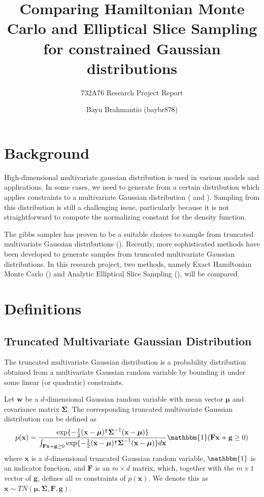 \documentclass{scrartcl}
\title{Comparing Hamiltonian Monte Carlo and Elliptical Slice Sampling for constrained Gaussian distributions}
\subtitle{732A76 Research Project Report}
\author{Bayu Brahmantio (baybr878)}
\numberwithin{equation}{section}
\begin{document}
\maketitle

\section{Background}
High-dimensional multivariate gaussian distribution is used in various models and applications. In some cases, we need to generate from a certain distribution which applies constraints to a multivariate Gaussian distribution (\cite{gelfand1992GS} and \cite{RodrguezYam2004EfficientGS}). Sampling from this distribution is still a challenging issue, particularly because it is not straightforward to compute the normalizing constant for the density function.  

The gibbs sampler has proven to be a suitable choices to sample from truncated multivariate Gaussian distributions (\cite{gelfand1992GS}). Recently, more sophisticated methods have been developed to generate samples from truncated multivariate Gaussian distributions. In this research project, two methods, namely Exact Hamiltonian Monte Carlo (\cite{pakman2013exact}) and Analytic Elliptical Slice Sampling (\cite{Fagan2016ESSwEP}), will be compared. 


\section{Definitions}
\subsection{Truncated Multivariate Gaussian Distribution}
The truncated multivariate Gaussian distribution is a probability distribution obtained from a multivariate Gaussian random variable by bounding it under some linear (or quadratic) constraints.   

Let $\textbf{w}$ be a $d$-dimensional Gaussian random variable with mean vector $\boldsymbol{\mu}$ and covariance matrix $\boldsymbol{\Sigma}$. The corresponding truncated multivariate Gaussian distribution can be defined as
\begin{equation}\label{eq:tmg}
	p(\boldsymbol{\textbf{x}}) = \frac{\exp\{-\frac{1}{2}(\textbf{x}-\boldsymbol{\mu})^{\intercal} \boldsymbol{\Sigma}^{-1}(\textbf{x}-\boldsymbol{\mu})\}}{\int_{\textbf{F}\textbf{x} + \textbf{g} \geq 0} \exp\{-\frac{1}{2}(\textbf{x}-\boldsymbol{\mu})^{\intercal} \boldsymbol{\Sigma}^{-1}(\textbf{x}-\boldsymbol{\mu})\} d\textbf{x}}\mathbbm{1}(\textbf{F}\textbf{x} + \textbf{g} \geq 0)
\end{equation}
where $\textbf{x}$ is a $d$-dimensional truncated Gaussian random variable, $\mathbbm{1}$ is an indicator function, and $\textbf{F}$ is an $m \times d$ matrix, which, together with the $m \times 1$ vector of $\textbf{g}$, defines all $m$ constraints of $p(\boldsymbol{\textbf{x}})$.  We denote this as $\textbf{x} \sim TN(\boldsymbol{\mu}, \boldsymbol{\Sigma},\textbf{F},\textbf{g})$.   
\end{document}
